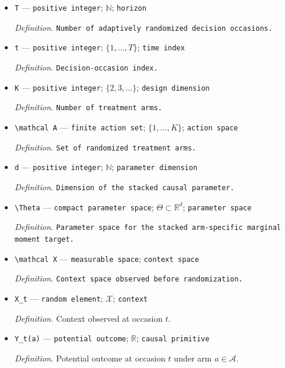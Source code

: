 \documentclass{article}
\begin{document}
\begin{itemize}
  \item \texttt{T} --- \texttt{positive integer}; \(\mathbb N\); \texttt{horizon}
  \par\smallskip\noindent\emph{Definition.} \texttt{Number of adaptively randomized decision occasions.}
  \item \texttt{t} --- \texttt{positive integer}; \(\{1,\ldots,T\}\); \texttt{time index}
  \par\smallskip\noindent\emph{Definition.} \texttt{Decision-\allowbreak{}occasion index.}
  \item \texttt{K} --- \texttt{positive integer}; \(\{2,3,\ldots\}\); \texttt{design dimension}
  \par\smallskip\noindent\emph{Definition.} \texttt{Number of treatment arms.}
  \item \texttt{\textbackslash{}\allowbreak{}mathcal A} --- \texttt{finite action set}; \(\{1,\ldots,K\}\); \texttt{action space}
  \par\smallskip\noindent\emph{Definition.} \texttt{Set of randomized treatment arms.}
  \item \texttt{d} --- \texttt{positive integer}; \(\mathbb N\); \texttt{parameter dimension}
  \par\smallskip\noindent\emph{Definition.} \texttt{Dimension of the stacked causal parameter.}
  \item \texttt{\textbackslash{}\allowbreak{}Theta} --- \texttt{compact parameter space}; \(\Theta\subset\mathbb R^d\); \texttt{parameter space}
  \par\smallskip\noindent\emph{Definition.} \texttt{Parameter space for the stacked arm-\allowbreak{}specific marginal moment target.}
  \item \texttt{\textbackslash{}\allowbreak{}mathcal X} --- \texttt{measurable space}; \texttt{context space}
  \par\smallskip\noindent\emph{Definition.} \texttt{Context space observed before randomization.}
  \item \texttt{X\_\allowbreak{}t} --- \texttt{random element}; \(\mathcal X\); \texttt{context}
  \par\smallskip\noindent\emph{Definition.} Context observed at occasion \(t\).
  \item \texttt{Y\_\allowbreak{}t(a)} --- \texttt{potential outcome}; \(\mathbb R\); \texttt{causal primitive}
  \par\smallskip\noindent\emph{Definition.} Potential outcome at occasion \(t\) under arm \(a\in\mathcal A\).

\end{itemize}
\end{document}
